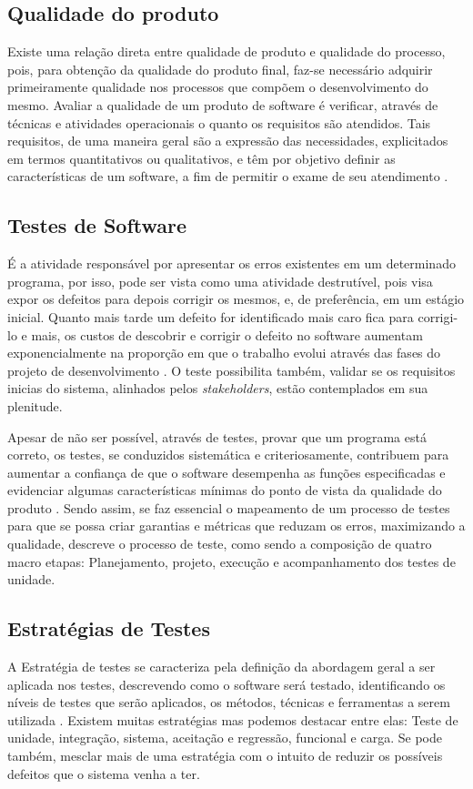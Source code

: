 \documentclass[tg]{mdtufsm}
\begin{document}
\subsection{Qualidade do produto}
Existe uma relação direta entre qualidade de produto e qualidade do processo, pois, para obtenção da qualidade do produto final,
faz-se necessário adquirir primeiramente qualidade nos processos que compõem o desenvolvimento do mesmo.
Avaliar a qualidade de um produto de software é verificar, através de técnicas e atividades operacionais o quanto os requisitos são atendidos. Tais requisitos,
de uma maneira geral são a expressão das necessidades, explicitados em termos quantitativos ou qualitativos, e têm por objetivo definir as características de
um software, a fim de permitir o exame de seu atendimento \cite{koscianski2007qualidade}.

\subsection{Testes de Software}
É a atividade responsável por apresentar os erros existentes em um determinado programa, por isso, pode ser vista como uma atividade destrutível, pois visa expor os defeitos para depois corrigir os mesmos, e, de preferência, em um estágio inicial. Quanto mais tarde um defeito for identificado mais caro fica para corrigi-lo e mais, os custos de descobrir e corrigir o defeito no software aumentam exponencialmente na proporção em que o trabalho evolui através das fases do projeto de desenvolvimento \cite{boehm1976quantitative}. O teste possibilita também, validar se os requisitos inicias do sistema, alinhados pelos \emph{stakeholders}, estão contemplados em sua plenitude.

Apesar de não ser possível, através de testes, provar que um programa está correto, os testes, se conduzidos sistemática e criteriosamente, contribuem para aumentar a confiança de que o software desempenha as funções especificadas e evidenciar algumas características mínimas do ponto de vista da qualidade do produto \cite{maldonado2004introduccao}. Sendo assim, se faz essencial o mapeamento de um processo de testes para que se possa criar garantias e métricas que reduzam os erros, maximizando a qualidade, \citeauthor{crespo2004metodologia} \cite{crespo2004metodologia} descreve o processo de teste, como sendo a composição de quatro macro etapas: Planejamento, projeto, execução e acompanhamento dos testes de unidade.

\subsection{Estratégias de Testes}
A Estratégia de testes se caracteriza pela definição da abordagem geral a ser aplicada nos testes, descrevendo como o software será testado, identificando os níveis de testes que serão aplicados, os métodos, técnicas e ferramentas a serem utilizada \cite{rios2006teste}. Existem muitas estratégias mas podemos destacar entre elas: Teste de unidade, integração, sistema, aceitação e regressão, funcional e carga. Se pode também, mesclar mais de uma estratégia com o intuito de reduzir os possíveis defeitos que o sistema venha a ter.
\end{document}
